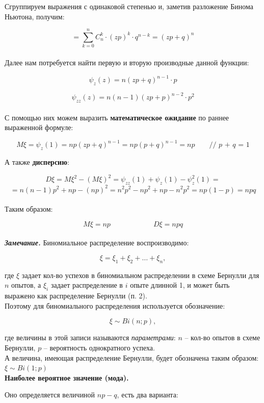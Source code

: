\documentclass{article}
\begin{document}
\begin{enumerate}
Сгруппируем выражения с одинаковой степенью и, заметив разложение Бинома Ньютона, получим:

$$= \sum\limits_{k = 0}^n C_n^k \cdot (zp)^k \cdot q^{n - k} = (zp + q)^n$$
\\

Далее нам потребуется найти первую и вторую производные данной функции:

$$\psi_z(z) = n(zp + q)^{n - 1} \cdot p$$

$$\psi_{zz}(z) = n(n - 1)(zp + p)^{n - 2}\cdot p^2$$
\\

С помощью них можем выразить \textbf{математическое ожидание} по раннее выраженной формуле:

$$M\xi = \psi_z(1) = np(zp + q)^{n - 1} = np(p + q)^{n - 1} = np 
\qquad \textit{// p + q = 1}$$

А также \textbf{дисперсию}:

$$D\xi = M\xi^2 - (M\xi)^2 = \psi_{zz}(1) + \psi_z(1) - \psi_z^2(1) =$$ 
$$ = n(n - 1)p^2 + np - (np)^2 = n^2p^2 - np^2 + np - n^2p^2 = np(1 - p) = npq$$
\\

Таким образом:

$$\boxed{M\xi = np} \qquad\qquad\qquad \boxed{D\xi = npq}$$
\\

\textit{\textbf{Замечание.}} Биномиальное распределение воспроизводимо:

$$\xi = \xi_1 + \xi_2 + \ldots + \xi_n,$$

где $\xi$ задает кол-во успехов в биномиальном распределении в схеме Бернулли для $n$ опытов,
а $\xi_i$ задает распределение в $i$ опыте длинной 1, и может быть выражено как распределение Бернулли (п. 2).
\\

Поэтому для биномиального распределения используется обозначение:

$$\boxed{\xi \sim Bi(n; p)},$$

где величины в этой записи называются \textit{параметрами}: $n$ -- кол-во опытов в схеме Бернулли, $p$ -- вероятность однократного успеха.
\\

А величина, имеющая распределение Бернулли, будет обозначена таким образом: $\xi \sim Bi(1; p)$
\\



\textbf{Наиболее вероятное значение (мода).}

Оно определяется величиной $np - q$, есть два варианта:


\end{enumerate}
\end{document}
